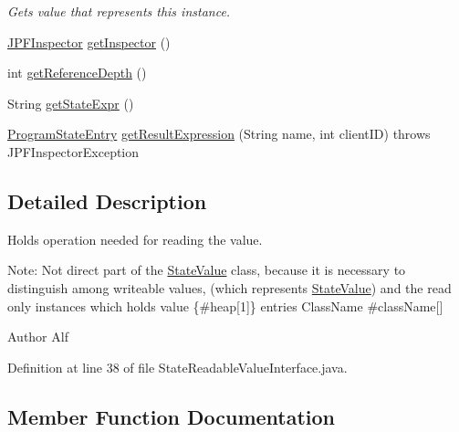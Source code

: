 \begin{DoxyCompactItemize}
\begin{DoxyCompactList}\small\item\em Gets value that represents this instance. \end{DoxyCompactList}\item 
\hyperlink{classgov_1_1nasa_1_1jpf_1_1inspector_1_1server_1_1jpf_1_1_j_p_f_inspector}{J\+P\+F\+Inspector} \hyperlink{interfacegov_1_1nasa_1_1jpf_1_1inspector_1_1server_1_1programstate_1_1_state_node_interface_af5208348883828a3aac1a37b7a94495f}{get\+Inspector} ()
\item 
int \hyperlink{interfacegov_1_1nasa_1_1jpf_1_1inspector_1_1server_1_1programstate_1_1_state_node_interface_a43421bffd69d07e4dc11d71504524287}{get\+Reference\+Depth} ()
\item 
String \hyperlink{interfacegov_1_1nasa_1_1jpf_1_1inspector_1_1server_1_1programstate_1_1_state_node_interface_ad6918e06b7d8b9a83b0b0e26540d94c8}{get\+State\+Expr} ()
\item 
\hyperlink{classgov_1_1nasa_1_1jpf_1_1inspector_1_1common_1_1pse_1_1_program_state_entry}{Program\+State\+Entry} \hyperlink{interfacegov_1_1nasa_1_1jpf_1_1inspector_1_1server_1_1programstate_1_1_state_node_interface_a6072d5b251380a0697a0e57e5a2e4e03}{get\+Result\+Expression} (String name, int client\+ID)  throws J\+P\+F\+Inspector\+Exception
\end{DoxyCompactItemize}


\subsection{Detailed Description}
Holds operation needed for reading the value. 

Note\+: Not direct part of the \hyperlink{classgov_1_1nasa_1_1jpf_1_1inspector_1_1server_1_1programstate_1_1_state_value}{State\+Value} class, because it is necessary to distinguish among writeable values, (which represents \hyperlink{classgov_1_1nasa_1_1jpf_1_1inspector_1_1server_1_1programstate_1_1_state_value}{State\+Value}) and the read only instances which holds value \{\#heap\mbox{[}1\mbox{]}\} entries Class\+Name \#class\+Name\mbox{[}\mbox{]}

\begin{DoxyAuthor}{Author}
Alf 
\end{DoxyAuthor}


Definition at line 38 of file State\+Readable\+Value\+Interface.\+java.



\subsection{Member Function Documentation}
